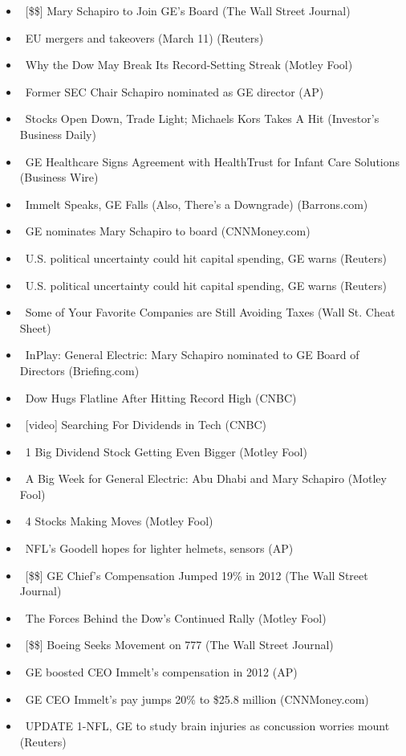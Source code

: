 \documentclass[11pt,asymmetric]{article}
\begin{document}
\begin{itemize}
\item\ [\$\$] Mary Schapiro to Join GE's Board (The Wall Street Journal)
\item\ EU mergers and takeovers (March 11) (Reuters)
\item\ Why the Dow May Break Its Record-Setting Streak (Motley Fool)
\item\ Former SEC Chair Schapiro nominated as GE director (AP)
\item\ Stocks Open Down, Trade Light; Michaels Kors Takes A Hit (Investor's Business Daily)
\item\ GE Healthcare Signs Agreement with HealthTrust for Infant Care Solutions (Business Wire)
\item\ Immelt Speaks, GE Falls (Also, There's a Downgrade) (Barrons.com)
\item\ GE nominates Mary Schapiro to board (CNNMoney.com)
\item\ U.S. political uncertainty could hit capital spending, GE warns (Reuters)
\item\ U.S. political uncertainty could hit capital spending, GE warns (Reuters)
\item\ Some of Your Favorite Companies are Still Avoiding Taxes (Wall St. Cheat Sheet)
\item\ InPlay: General Electric: Mary Schapiro nominated to GE Board of Directors (Briefing.com)
\item\ Dow Hugs Flatline After Hitting Record High (CNBC)
\item\ [video] Searching For Dividends in Tech (CNBC)
\item\ 1 Big Dividend Stock Getting Even Bigger (Motley Fool)
\item\ A Big Week for General Electric: Abu Dhabi and Mary Schapiro (Motley Fool)
\item\ 4 Stocks Making Moves (Motley Fool)
\item\ NFL's Goodell hopes for lighter helmets, sensors (AP)
\item\ [\$\$] GE Chief's Compensation Jumped 19\% in 2012 (The Wall Street Journal)
\item\ The Forces Behind the Dow's Continued Rally (Motley Fool)
\item\ [\$\$] Boeing Seeks Movement on 777 (The Wall Street Journal)
\item\ GE boosted CEO Immelt's compensation in 2012 (AP)
\item\ GE CEO Immelt's pay jumps 20\% to \$25.8 million (CNNMoney.com)
\item\ UPDATE 1-NFL, GE to study brain injuries as concussion worries mount (Reuters)

\end{itemize}
\end{document}
